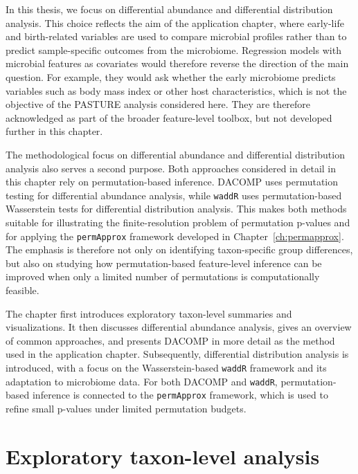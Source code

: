 In this thesis, we focus on differential abundance and differential distribution analysis. This choice reflects the aim of the application chapter, where early-life and birth-related variables are used to compare microbial profiles rather than to predict sample-specific outcomes from the microbiome. Regression models with microbial features as covariates would therefore reverse the direction of the main question. For example, they would ask whether the early microbiome predicts variables such as body mass index or other host characteristics, which is not the objective of the PASTURE analysis considered here. They are therefore acknowledged as part of the broader feature-level toolbox, but not developed further in this chapter.

The methodological focus on differential abundance and differential distribution analysis also serves a second purpose. Both approaches considered in detail in this chapter rely on permutation-based inference. DACOMP uses permutation testing for differential abundance analysis, while \texttt{waddR} uses permutation-based Wasserstein tests for differential distribution analysis. This makes both methods suitable for illustrating the finite-resolution problem of permutation p-values and for applying the \texttt{permApprox} framework developed in Chapter~\ref{ch:permapprox}. The emphasis is therefore not only on identifying taxon-specific group differences, but also on studying how permutation-based feature-level inference can be improved when only a limited number of permutations is computationally feasible.

The chapter first introduces exploratory taxon-level summaries and visualizations. It then discusses differential abundance analysis, gives an overview of common approaches, and presents DACOMP in more detail as the method used in the application chapter. Subsequently, differential distribution analysis is introduced, with a focus on the Wasserstein-based \texttt{waddR} framework and its adaptation to microbiome data. For both DACOMP and \texttt{waddR}, permutation-based inference is connected to the \texttt{permApprox} framework, which is used to refine small p-values under limited permutation budgets.

\section{Exploratory taxon-level analysis}
\label{sec:4feature:exploratory}

